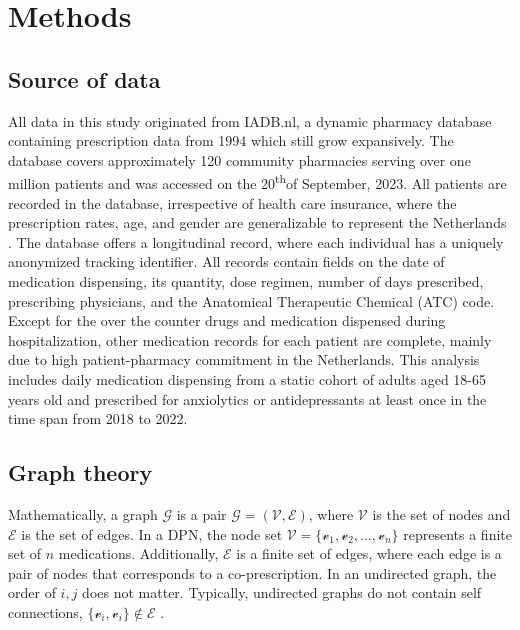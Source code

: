 \documentclass[
  authoryear,
  review]{elsarticle}
\begin{document}
\section{Methods}\label{methods}

\subsection{Source of data}\label{source-of-data}

All data in this study originated from IADB.nl, a dynamic pharmacy
database containing prescription data from 1994 which still grow
expansively. The database covers approximately 120 community pharmacies
serving over one million patients and was accessed on the
20\textsuperscript{th}of September, 2023. All patients are recorded in
the database, irrespective of health care insurance, where the
prescription rates, age, and gender are generalizable to represent the
Netherlands \citep{Visser2013}. The database offers a longitudinal
record, where each individual has a uniquely anonymized tracking
identifier. All records contain fields on the date of medication
dispensing, its quantity, dose regimen, number of days prescribed,
prescribing physicians, and the Anatomical Therapeutic Chemical (ATC)
code. Except for the over the counter drugs and medication dispensed
during hospitalization, other medication records for each patient are
complete, mainly due to high patient-pharmacy commitment in the
Netherlands. This analysis includes daily medication dispensing from a
static cohort of adults aged 18-65 years old and prescribed for
anxiolytics or antidepressants at least once in the time span from 2018
to 2022.

\subsection{Graph theory}\label{graph-theory}

Mathematically, a graph \(\mathcal{G}\) is a pair
\(\mathcal{G} = (\mathcal{V}, \mathcal{E})\), where \(\mathcal{V}\) is
the set of nodes and \(\mathcal{E}\) is the set of edges. In a DPN, the
node set
\(\mathcal{V} = \{\mathcal{v}_1, \mathcal{v}_2, \dots, \mathcal{v}_n\}\)
represents a finite set of \(n\) medications. Additionally,
\(\mathcal{E}\) is a finite set of edges, where each edge is a pair of
nodes that corresponds to a co-prescription. In an undirected graph, the
order of \(i, j\) does not matter. Typically, undirected graphs do not
contain self connections,
\(\{\mathcal{v}_i, \mathcal{v}_i\} \notin \mathcal{E}\)
\citep{estrada2012structure}.
\end{document}
